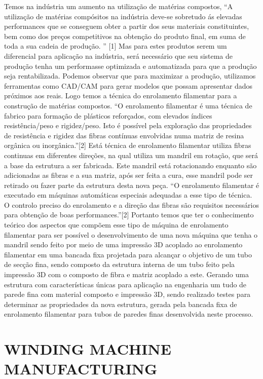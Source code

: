\documentclass[10pt,fleqn,a4paper,twoside]{article}
\begin{document}
Temos na indústria um aumento na utilização de matérias compostos, “A utilização de matérias compósitos na indústria deve-se sobretudo ás elevadas performances que se conseguem obter a partir dos seus materiais constituintes, bem como dos preços competitivos na obtenção do produto final, em suma de toda a sua cadeia de produção. ” [1]
Mas para estes produtos serem um diferencial para aplicação na indústria, será necessário que seu sistema de produção tenha um performasse optimizada e automatizada para que a produção seja rentabilizada. Podemos observar que para maximizar a produção, utilizamos ferramentas como CAD/CAM para gerar modelos que possam apresentar dados próximos aos reais.
Logo temos a técnica do enrolamento filamentar para a construção de matérias compostos.
“O enrolamento filamentar é uma técnica de fabrico para formação de plásticos reforçados, com elevados índices resistência/peso e rigidez/peso. Isto é possível pela exploração das propriedades de resistência e rigidez das fibras contínuas envolvidas numa matriz de resina orgânica ou inorgânica.”[2]
Está técnica de enrolamento filamentar utiliza fibras continuas em diferentes direções, na qual utiliza um mandril em rotação, que será a base da estrutura a ser fabricada. Este mandril está rotacionando enquanto são adicionadas as fibras e a sua matriz, após ser feita a cura, esse mandril pode ser retirado ou fazer parte da estrutura desta nova peça.
“O enrolamento filamentar é executado em máquinas automáticas especiais adequadas a esse tipo de técnica. O controlo preciso do enrolamento e a direção das fibras são requisitos necessários para obtenção de boas performances.”[2]
Portanto temos que ter o conhecimento teórico dos aspectos que compõem esse tipo de máquina de enrolamento filamentar para ser possível o desenvolvimento de uma nova máquina que tenha o mandril sendo feito por meio de uma impressão 3D acoplado ao enrolamento filamentar em uma bancada fixa projetada para alcançar o objetivo de um tubo de secção fina, sendo composto da estrutura interna de um tubo feito pela impressão 3D com o composto de fibra e matriz acoplado a este. 
Gerando uma estrutura com características únicas para aplicação na engenharia um tudo de parede fina com material composto e impressão 3D, sendo realizado testes para determinar as propriedades da nova estrutura, gerada pela bancada fixa de enrolamento filamentar para tubos de paredes finas desenvolvida neste processo.   

\section{WINDING MACHINE MANUFACTURING}
\end{document}

